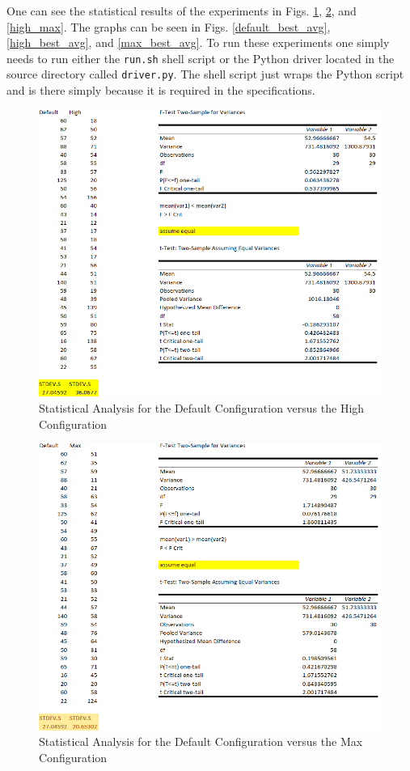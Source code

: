 One can see the statistical results of the experiments in Figs. \ref{default_high}, \ref{default_max}, and \ref{high_max}.
The graphs can be seen in Figs. \ref{default_best_avg}, \ref{high_best_avg}, and \ref{max_best_avg}.
To run these experiments one simply needs to run either the \texttt{run.sh} shell script or the Python driver located in the source directory called \texttt{driver.py}.
The shell script just wraps the Python script and is there simply because it is required in the specifications.

\begin{figure}[H]
    \centering
    \includegraphics[width=.8\linewidth]{images/stats/default_high.png}
    \caption{Statistical Analysis for the Default Configuration versus the High Configuration}
    \label{default_high}
\end{figure}

\begin{figure}[H]
    \centering
    \includegraphics[width=.8\linewidth]{images/stats/default_max.png}
    \caption{Statistical Analysis for the Default Configuration versus the Max Configuration}
    \label{default_max}
\end{figure}

